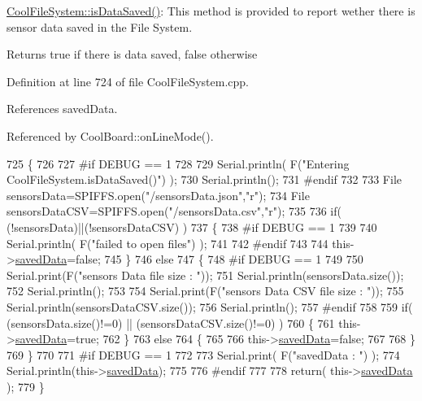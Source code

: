 \hyperlink{classCoolFileSystem_a5a7eaeea7a9fbf8aaef651d862fa3b5b}{Cool\+File\+System\+::is\+Data\+Saved()}\+: This method is provided to report wether there is sensor data saved in the File System.

\begin{DoxyReturn}{Returns}
true if there is data saved, false otherwise 
\end{DoxyReturn}


Definition at line 724 of file Cool\+File\+System.\+cpp.



References saved\+Data.



Referenced by Cool\+Board\+::on\+Line\+Mode().


\begin{DoxyCode}
725 \{
726 
727 \textcolor{preprocessor}{#if DEBUG == 1 }
728 
729     Serial.println( F(\textcolor{stringliteral}{"Entering CoolFileSystem.isDataSaved()"}) );
730     Serial.println();
731 \textcolor{preprocessor}{#endif}
732 
733     File sensorsData=SPIFFS.open(\textcolor{stringliteral}{"/sensorsData.json"},\textcolor{stringliteral}{"r"});
734     File sensorsDataCSV=SPIFFS.open(\textcolor{stringliteral}{"/sensorsData.csv"},\textcolor{stringliteral}{"r"});
735     
736     \textcolor{keywordflow}{if}( (!sensorsData)||(!sensorsDataCSV) ) 
737     \{
738 \textcolor{preprocessor}{    #if DEBUG == 1}
739 
740         Serial.println( F(\textcolor{stringliteral}{"failed to open files"}) );
741 
742 \textcolor{preprocessor}{    #endif}
743         
744         this->\hyperlink{classCoolFileSystem_ad398e0c5c41a0c88acdf5d672aa71351}{savedData}=\textcolor{keyword}{false};
745     \}
746     \textcolor{keywordflow}{else}
747     \{       
748 \textcolor{preprocessor}{        #if DEBUG == 1}
749 
750             Serial.print(F(\textcolor{stringliteral}{"sensors Data file size : "}));
751             Serial.println(sensorsData.size());
752             Serial.println();
753             
754             Serial.print(F(\textcolor{stringliteral}{"sensors Data CSV file size : "}));               
755             Serial.println(sensorsDataCSV.size());
756             Serial.println();
757 \textcolor{preprocessor}{        #endif  }
758 
759         \textcolor{keywordflow}{if}( (sensorsData.size()!=0) || (sensorsDataCSV.size()!=0) )
760         \{
761             this->\hyperlink{classCoolFileSystem_ad398e0c5c41a0c88acdf5d672aa71351}{savedData}=\textcolor{keyword}{true};
762         \}
763         \textcolor{keywordflow}{else}
764         \{
765 
766             this->\hyperlink{classCoolFileSystem_ad398e0c5c41a0c88acdf5d672aa71351}{savedData}=\textcolor{keyword}{false};     
767         
768         \}   
769     \}
770 
771 \textcolor{preprocessor}{#if DEBUG == 1 }
772 
773     Serial.print( F(\textcolor{stringliteral}{"savedData : "}) );
774     Serial.println(this->\hyperlink{classCoolFileSystem_ad398e0c5c41a0c88acdf5d672aa71351}{savedData});
775 
776 \textcolor{preprocessor}{#endif}
777 
778     \textcolor{keywordflow}{return}( this->\hyperlink{classCoolFileSystem_ad398e0c5c41a0c88acdf5d672aa71351}{savedData} );
779 \}
\end{DoxyCode}
